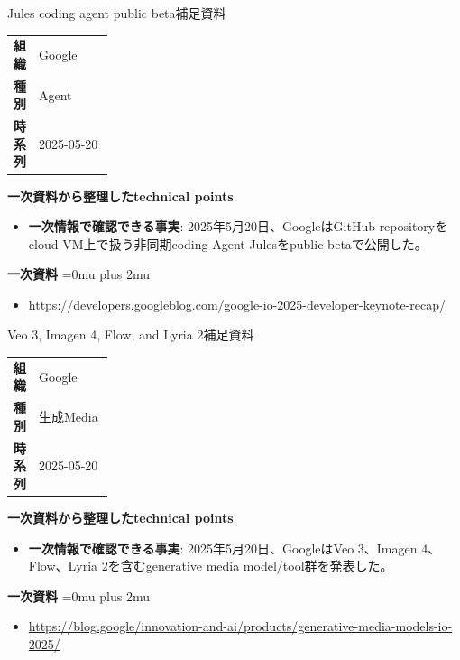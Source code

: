 \begin{technicalnote}{Jules coding agent public beta}{補足資料}
\begingroup
\begin{tabularx}{\linewidth}{@{}>{\bfseries}p{0.22\linewidth}X@{}}
組織 & Google \\
種別 & Agent \\
時系列 & 2025-05-20 \\
\end{tabularx}
\smallskip
{\bfseries 一次資料から整理したtechnical points}
\begin{itemize}[leftmargin=1.5em,itemsep=0.35em]
\item \textbf{一次情報で確認できる事実}: 2025年5月20日、GoogleはGitHub repositoryをcloud VM上で扱う非同期coding Agent Julesをpublic betaで公開した。
\end{itemize}
\begin{samepage}
{\bfseries 一次資料}
\begingroup\sloppy
\Urlmuskip=0mu plus 2mu\relax
\begin{itemize}[leftmargin=1.5em,itemsep=0.25em]
\item {\scriptsize\url{https://developers.googleblog.com/google-io-2025-developer-keynote-recap/}}
\end{itemize}
\endgroup
\end{samepage}
\endgroup
\end{technicalnote}
\medskip

\begin{technicalnote}{Veo 3, Imagen 4, Flow, and Lyria 2}{補足資料}
\begingroup
\begin{tabularx}{\linewidth}{@{}>{\bfseries}p{0.22\linewidth}X@{}}
組織 & Google \\
種別 & 生成Media \\
時系列 & 2025-05-20 \\
\end{tabularx}
\smallskip
{\bfseries 一次資料から整理したtechnical points}
\begin{itemize}[leftmargin=1.5em,itemsep=0.35em]
\item \textbf{一次情報で確認できる事実}: 2025年5月20日、GoogleはVeo 3、Imagen 4、Flow、Lyria 2を含むgenerative media model/tool群を発表した。
\end{itemize}
\begin{samepage}
{\bfseries 一次資料}
\begingroup\sloppy
\Urlmuskip=0mu plus 2mu\relax
\begin{itemize}[leftmargin=1.5em,itemsep=0.25em]
\item {\scriptsize\url{https://blog.google/innovation-and-ai/products/generative-media-models-io-2025/}}
\end{itemize}
\endgroup
\end{samepage}
\endgroup
\end{technicalnote}
\medskip

